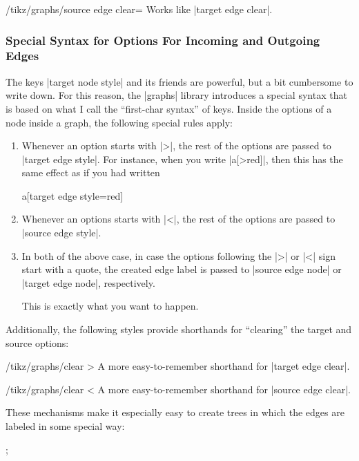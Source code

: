 \begin{key}{/tikz/graphs/source edge clear=}
    Works like |target edge clear|.
\end{key}


\subsubsection{Special Syntax for Options For Incoming and Outgoing Edges}
\label{section-syntax-outgoing-incoming}

The keys |target node style| and its friends are powerful, but a bit cumbersome
to write down. For this reason, the |graphs| library introduces a special
syntax that is based on what I call the ``first-char syntax'' of keys. Inside
the options of a node inside a graph, the following special rules apply:
%
\begin{enumerate}
    \item Whenever an option starts with |>|, the rest of the options are
        passed to |target edge style|. For instance, when you write |a[>red]|,
        then this has the same effect as if you had written
\begin{codeexample}
a[target edge style={red}]
\end{codeexample}
    \item Whenever an options starts with |<|, the rest of the options are
        passed to |source edge style|.
    \item In both of the above case, in case the options following the |>| or
        |<| sign start with a quote, the created edge label is passed to
        |source edge node| or |target edge node|, respectively.

        This is exactly what you want to happen.
\end{enumerate}
%
Additionally, the following styles provide shorthands for ``clearing'' the
target and source options:
%
\begin{key}{/tikz/graphs/clear >}
    A more easy-to-remember shorthand for |target edge clear|.
\end{key}
%
\begin{key}{/tikz/graphs/clear <}
    A more easy-to-remember shorthand for |source edge clear|.
\end{key}

These mechanisms make it especially easy to create trees in which the edges are
labeled in some special way:
%
\begin{codeexample}[preamble={\usetikzlibrary{graphs,quotes}}]
\tikz
  ;
\end{codeexample}


